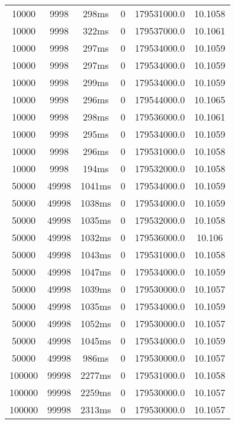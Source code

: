 \documentclass[./main.tex]{subfiles}
\begin{document}
\begin{table}
\begin{tabular}{ c | c | c | c | c | c }
        10000 & 9998 & 298ms & 0 & 179531000.0 & 10.1058 \\
        10000 & 9998 & 322ms & 0 & 179537000.0 & 10.1061 \\
        \rowcolor{lightgray} 10000 & 9998 & 297ms & 0 & 179534000.0 & 10.1059 \\
        \rowcolor{lightgray} 10000 & 9998 & 297ms & 0 & 179534000.0 & 10.1059 \\
        \rowcolor{lightgray} 10000 & 9998 & 299ms & 0 & 179534000.0 & 10.1059 \\
        10000 & 9998 & 296ms & 0 & 179544000.0 & 10.1065 \\
        10000 & 9998 & 298ms & 0 & 179536000.0 & 10.1061 \\
        \rowcolor{lightgray} 10000 & 9998 & 295ms & 0 & 179534000.0 & 10.1059 \\
        10000 & 9998 & 296ms & 0 & 179531000.0 & 10.1058 \\
        10000 & 9998 & 194ms & 0 & 179532000.0 & 10.1058 \\
        \hline
        \rowcolor{lightgray} 50000 & 49998 & 1041ms & 0 & 179534000.0 & 10.1059 \\
        \rowcolor{lightgray} 50000 & 49998 & 1038ms & 0 & 179534000.0 & 10.1059 \\
        50000 & 49998 & 1035ms & 0 & 179532000.0 & 10.1058 \\
        50000 & 49998 & 1032ms & 0 & 179536000.0 & 10.106 \\
        50000 & 49998 & 1043ms & 0 & 179531000.0 & 10.1058 \\
        \rowcolor{lightgray} 50000 & 49998 & 1047ms & 0 & 179534000.0 & 10.1059 \\
        50000 & 49998 & 1039ms & 0 & 179530000.0 & 10.1057 \\
        \rowcolor{lightgray} 50000 & 49998 & 1035ms & 0 & 179534000.0 & 10.1059 \\
        50000 & 49998 & 1052ms & 0 & 179530000.0 & 10.1057 \\
        \rowcolor{lightgray} 50000 & 49998 & 1045ms & 0 & 179534000.0 & 10.1059 \\
        50000 & 49998 & 986ms & 0 & 179530000.0 & 10.1057 \\
        \hline
        100000 & 99998 & 2277ms & 0 & 179531000.0 & 10.1058 \\
        \rowcolor{lightgray} 100000 & 99998 & 2259ms & 0 & 179530000.0 & 10.1057 \\
        \rowcolor{lightgray} 100000 & 99998 & 2313ms & 0 & 179530000.0 & 10.1057 \\

\end{tabular}
\end{table}
\end{document}
